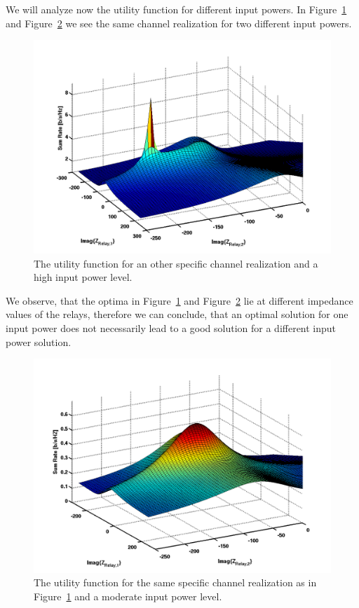 We will analyze now the utility function for different input powers.
In Figure~\ref{fig:utility_power2} and Figure~\ref{fig:utility_power3} we see the same channel realization for two different input powers.

\begin{figure}[h]
\centering
  \includegraphics[width=0.8\linewidth]{images/full_mesh_highsnr_99.png}
\caption{The utility function for an other specific channel realization and a high input power level.}
\label{fig:utility_power2}
\end{figure}

We observe, that the optima in Figure~\ref{fig:utility_power2} and Figure~\ref{fig:utility_power3} lie at different impedance values of the relays, therefore we can conclude, that an optimal solution for one input power does not necessarily lead to a good solution for a different input power solution.

\begin{figure}[h]
\centering
  \includegraphics[width=0.8\linewidth]{images/full_mesh_modsnr_99.png}
\caption{The utility function for the same specific channel realization as in Figure~\ref{fig:utility_power2} and a moderate input power level.}
\label{fig:utility_power3}
\end{figure}

